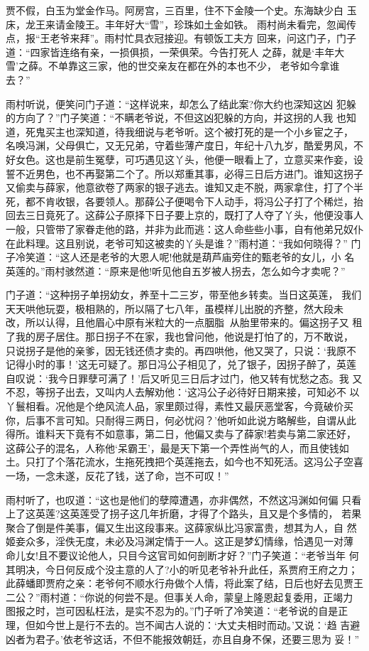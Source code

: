 贾不假，白玉为堂金作马。阿房宫，三百里，住不下金陵一个史。东海缺少白
玉床，龙王来请金陵王。丰年好大“雪”，珍珠如土金如铁。
雨村尚未看完，忽闻传点，报“王老爷来拜”。雨村忙具衣冠接迎。有顿饭工夫方
回来，问这门子，门子道：“四家皆连络有亲，一损俱损，一荣俱荣。今告打死人
之薛，就是‘丰年大雪’之薛。不单靠这三家，他的世交亲友在都在外的本也不少，
老爷如今拿谁去？”

雨村听说，便笑问门子道：“这样说来，却怎么了结此案?你大约也深知这凶
犯躲的方向了？”门子笑道：“不瞒老爷说，不但这凶犯躲的方向，并这拐的人我
也知道，死鬼买主也深知道，待我细说与老爷听。这个被打死的是一个小乡宦之子，
名唤冯渊，父母俱亡，又无兄弟，守着些薄产度日，年纪十八九岁，酷爱男风，不
好女色。这也是前生冤孽，可巧遇见这丫头，他便一眼看上了，立意买来作妾，设
誓不近男色，也不再娶第二个了。所以郑重其事，必得三日后方进门。谁知这拐子
又偷卖与薛家，他意欲卷了两家的银子逃去。谁知又走不脱，两家拿住，打了个半
死，都不肯收银，各要领人。那薛公子便喝令下人动手，将冯公子打了个稀烂，抬
回去三日竟死了。这薛公子原择下日子要上京的，既打了人夺了丫头，他便没事人
一般，只管带了家眷走他的路，并非为此而逃：这人命些些小事，自有他弟兄奴仆
在此料理。这且别说，老爷可知这被卖的丫头是谁？”雨村道：“我如何晓得？”
门子冷笑道：“这人还是老爷的大恩人呢!他就是葫芦庙旁住的甄老爷的女儿，小
名英莲的。”雨村骇然道：“原来是他!听见他自五岁被人拐去，怎么如今才卖呢？”

门子道：“这种拐子单拐幼女，养至十二三岁，带至他乡转卖。当日这英莲，
我们天天哄他玩耍，极相熟的，所以隔了七八年，虽模样儿出脱的齐整，然大段未
改，所以认得，且他眉心中原有米粒大的一点胭脂，从胎里带来的。偏这拐子又
租了我的房子居住。那日拐子不在家，我也曾问他，他说是打怕了的，万不敢说，
只说拐子是他的亲爹，因无钱还债才卖的。再四哄他，他又哭了，只说：‘我原不
记得小时的事！’这无可疑了。那日冯公子相见了，兑了银子，因拐子醉了，英莲
自叹说：‘我今日罪孽可满了！’后又听见三日后才过门，他又转有忧愁之态。我
又不忍，等拐子出去，又叫内人去解劝他：‘这冯公子必待好日期来接，可知必不
以丫鬟相看。况他是个绝风流人品，家里颇过得，素性又最厌恶堂客，今竟破价买
你，后事不言可知。只耐得三两日，何必忧闷？’他听如此说方略解些，自谓从此
得所。谁料天下竟有不如意事，第二日，他偏又卖与了薛家!若卖与第二家还好，
这薛公子的混名，人称他‘呆霸王’，最是天下第一个弄性尚气的人，而且使钱如
土。只打了个落花流水，生拖死拽把个英莲拖去，如今也不知死活。这冯公子空喜
一场，一念未遂，反花了钱，送了命，岂不可叹！”

雨村听了，也叹道：“这也是他们的孽障遭遇，亦非偶然，不然这冯渊如何偏
只看上了这英莲?这英莲受了拐子这几年折磨，才得了个路头，且又是个多情的，
若果聚合了倒是件美事，偏又生出这段事来。这薛家纵比冯家富贵，想其为人，自
然姬妾众多，淫佚无度，未必及冯渊定情于一人。这正是梦幻情缘，恰遇见一对薄
命儿女!且不要议论他人，只目今这官司如何剖断才好？”门子笑道：“老爷当年
何其明决，今日何反成个没主意的人了?小的听见老爷补升此任，系贾府王府之力；
此薛蟠即贾府之亲：老爷何不顺水行舟做个人情，将此案了结，日后也好去见贾王
二公？”雨村道：“你说的何尝不是。但事关人命，蒙皇上隆恩起复委用，正竭力
图报之时，岂可因私枉法，是实不忍为的。”门子听了冷笑道：“老爷说的自是正
理，但如今世上是行不去的。岂不闻古人说的：‘大丈夫相时而动。’又说：‘趋
吉避凶者为君子。’依老爷这话，不但不能报效朝廷，亦且自身不保，还要三思为
妥！”

